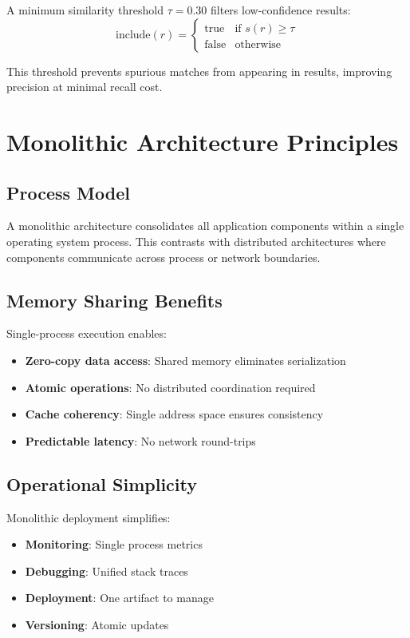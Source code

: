 A minimum similarity threshold $\tau = 0.30$ filters low-confidence results:
\[
\text{include}(r) = \begin{cases}
\text{true} & \text{if } s(r) \ge \tau \\
\text{false} & \text{otherwise}
\end{cases}
\]

This threshold prevents spurious matches from appearing in results, improving precision at minimal recall cost.

\section{Monolithic Architecture Principles}

\subsection{Process Model}

A monolithic architecture consolidates all application components within a single operating system process. This contrasts with distributed architectures where components communicate across process or network boundaries.

\subsection{Memory Sharing Benefits}

Single-process execution enables:
\begin{itemize}[leftmargin=*,itemsep=2pt,topsep=2pt]
\item \textbf{Zero-copy data access}: Shared memory eliminates serialization
\item \textbf{Atomic operations}: No distributed coordination required
\item \textbf{Cache coherency}: Single address space ensures consistency
\item \textbf{Predictable latency}: No network round-trips
\end{itemize}

\subsection{Operational Simplicity}

Monolithic deployment simplifies:
\begin{itemize}[leftmargin=*,itemsep=2pt,topsep=2pt]
\item \textbf{Monitoring}: Single process metrics
\item \textbf{Debugging}: Unified stack traces
\item \textbf{Deployment}: One artifact to manage
\item \textbf{Versioning}: Atomic updates
\end{itemize}

